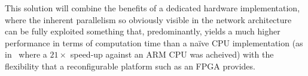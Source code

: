 This solution will combine the benefits of a dedicated hardware implementation, where the inherent parallelism so obviously visible in the network architecture can be fully exploited something that, predominantly, yields a much higher performance in terms of computation time than a naïve CPU implementation (as in~\cite{Maeda05} where a $21\times$ speed-up against an ARM CPU was acheived) with the flexibility that a reconfigurable platform such as an FPGA provides. 
